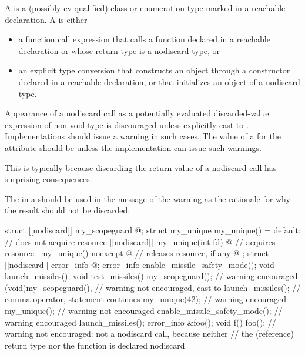 \pnum
A  is
a (possibly cv-qualified) class or enumeration type
marked  in a reachable declaration.
A  is either
\begin{itemize}
\item
  a function call expression
  that calls a function declared  in a reachable declaration or
  whose return type is a nodiscard type, or
\item
  an explicit type
  conversion
  that constructs an object through
  a constructor declared  in a reachable declaration, or
  that initializes an object of a nodiscard type.
\end{itemize}

\pnum
\recommended
Appearance of a nodiscard call as
a potentially evaluated discarded-value expression
of non-void type
is discouraged unless explicitly cast to .
Implementations should issue a warning in such cases.
The value of
a  for the  attribute
should be  unless the implementation can issue such warnings.
\begin{note}
This is typically because discarding the return value
of a nodiscard call has surprising consequences.
\end{note}
The 
in a  
should be used in the message of the warning
as the rationale for why the result should not be discarded.

\pnum
\begin{example}
\begin{codeblock}
struct [[nodiscard]] my_scopeguard { @\commentellip@ };
struct my_unique {
  my_unique() = default;                                // does not acquire resource
  [[nodiscard]] my_unique(int fd) { @\commentellip@ }         // acquires resource
  ~my_unique() noexcept { @\commentellip@ }                   // releases resource, if any
  @\commentellip@
};
struct [[nodiscard]] error_info { @\commentellip@ };
error_info enable_missile_safety_mode();
void launch_missiles();
void test_missiles() {
  my_scopeguard();              // warning encouraged
  (void)my_scopeguard(),        // warning not encouraged, cast to 
    launch_missiles();          // comma operator, statement continues
  my_unique(42);                // warning encouraged
  my_unique();                  // warning not encouraged
  enable_missile_safety_mode(); // warning encouraged
  launch_missiles();
}
error_info &foo();
void f() { foo(); }             // warning not encouraged: not a nodiscard call, because neither
                                // the (reference) return type nor the function is declared nodiscard
\end{codeblock}
\end{example}

